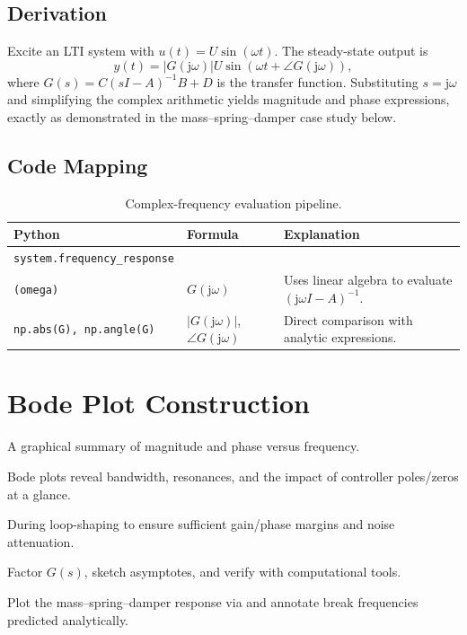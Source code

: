 \subsection{Derivation}
Excite an LTI system with $u(t) = U \sin(\omega t)$. The steady-state output is
\[
    y(t) = |G(\mathrm{j}\omega)| U \sin\left(\omega t + \angle G(\mathrm{j}\omega)\right),
\]
where $G(s) = C (sI - A)^{-1} B + D$ is the transfer function. Substituting $s = \mathrm{j}\omega$ and simplifying the complex arithmetic yields magnitude and phase expressions, exactly as demonstrated in the mass–spring–damper case study below.

\subsection{Code Mapping}
\begin{table}[h]
    \centering
    \small
    \renewcommand{\arraystretch}{1.2}
    \begin{tabularx}{\linewidth}{|>{\raggedright\arraybackslash}p{4cm}|X|X|}
        \hline
        \textbf{Python} & \textbf{Formula} & \textbf{Explanation} \\
        \hline
        \texttt{system.frequency\_response}\\\texttt{(omega)} & $G(\mathrm{j}\omega)$ & Uses linear algebra to evaluate $(\mathrm{j}\omega I - A)^{-1}$. \\
        \hline
        \texttt{np.abs(G), np.angle(G)} & $|G(\mathrm{j}\omega)|$, $\angle G(\mathrm{j}\omega)$ & Direct comparison with analytic expressions. \\
        \hline
    \end{tabularx}
    \caption{Complex-frequency evaluation pipeline.}
\end{table}

\section{Bode Plot Construction}
\begin{beginnerguide}
    \item[\textbf{What?}] A graphical summary of magnitude and phase versus frequency.
    \item[\textbf{Why?}] Bode plots reveal bandwidth, resonances, and the impact of controller poles/zeros at a glance.
    \item[\textbf{When?}] During loop-shaping to ensure sufficient gain/phase margins and noise attenuation.
    \item[\textbf{How?}] Factor $G(s)$, sketch asymptotes, and verify with computational tools.
    \item[\textbf{Example}] Plot the mass--spring--damper response via  and annotate break frequencies predicted analytically.
\end{beginnerguide}
